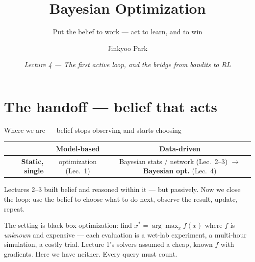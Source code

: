 \documentclass[10pt, aspectratio=169]{beamer}
\title{Bayesian Optimization}
\subtitle{Put the belief to work --- act to learn, and to win}
\author{Jinkyoo Park}
\institute{KAIST}
\date{\textit{Lecture 4 --- The first active loop, and the bridge from bandits to RL}}
\begin{document}
\maketitle

\section{The handoff --- belief that acts}

\begin{frame}{Where we are --- belief stops observing and starts choosing}
\vspace{2pt}
\begin{center}\footnotesize\renewcommand{\arraystretch}{1.5}
\begin{tabular}{r|c|c}
 & \textbf{Model-based} & \textbf{Data-driven} \\
\hline
\textbf{Static, single}  & optimization \scriptsize(Lec.\ 1) & Bayesian stats / network \scriptsize(Lec.\ 2--3) $\to$ \cellcolor{mDarkTeal!20}\textbf{Bayesian opt.} \scriptsize(\alert{Lec.\ 4})\\
\end{tabular}
\end{center}
\smallskip

Lectures 2--3 built belief and reasoned within it --- but passively. Now we close the loop: \alert{use the belief to choose what to do next}, observe the result, update, repeat.
\smallskip

\pause
The setting is \alert{black-box optimization}: find $x^* = \arg\max_x f(x)$ where $f$ is \emph{unknown} and \alert{expensive} --- each evaluation is a wet-lab experiment, a multi-hour simulation, a costly trial. Lecture 1's solvers assumed a cheap, known $f$ with gradients. Here we have neither. Every query must count.
\end{frame}
\end{document}
